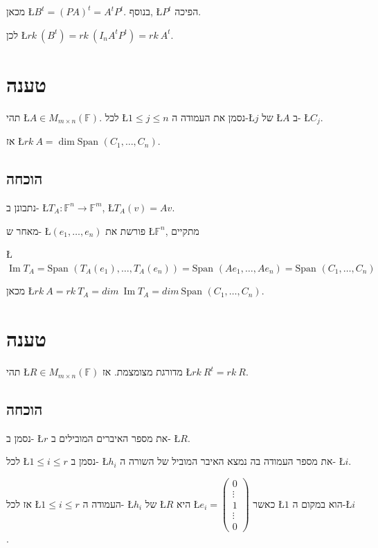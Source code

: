 \documentclass[english,hebrew]{article}
\newcommand{\matrmn}{M_{m\times n}(\mathbb{F})}
\newcommand{\spn}{\text{Span }}
\begin{document}
מכאן \L{$B^{t}=(PA)^{t}=A^{t}P^{t}$}. בנוסף, \L{$P^{t}$} הפיכה.

לכן \L{$rk\:(B^{t})=rk\:(I_{n}A^{t}P^{t})=rk\ A^{t}$}.

\section{טענה}

תהי \L{$A\in\matrmn$}. לכל \L{$1\leq j\le n$} נסמן את העמודה ה-\L{$j$}
של \L{$A$} ב- \L{$C_{j}$}.

אז \L{$rk\:A=\dim\spn(C_{1},\dots,C_{n})$}.

\subsection{הוכחה}

נתבונן ב- \L{$T_{A}:\mathbb{F}^{n}\rightarrow\mathbb{F}^{m}$}, \L{$T_{A}(v)=Av$}.

מאחר ש- \L{$(e_{1},\dots,e_{n})$} פורשת את \L{$\mathbb{F}^{n}$},
מתקיים
\begin{flushright}
\L{$\operatorname{Im}T_{A}=\spn(T_{A}(e_{1}),\dots,T_{A}(e_{n}))=\spn(Ae_{1},\dots,Ae_{n})=\spn(C_{1},\dots,C_{n})$}
\par\end{flushright}

מכאן \L{$rk\:A=rk\:T_{A}=dim\:\operatorname{Im}T_{A}=dim\:\spn(C_{1},\dots,C_{n})$}.

\section{טענה}

תהי \L{$R\in\matrmn$} מדורגת מצומצמת. אז \L{$rk\:R^{t}=rk\:R$}.

\subsection{הוכחה}

נסמן ב- \L{$r$} את מספר האיברים המובילים ב- \L{$R$}.

לכל \L{$1\leq i\leq r$} נסמן ב- \L{$h_{i}$} את מספר העמודה בה נמצא
האיבר המוביל של השורה ה- \L{$i$}.

אז לכל \L{$1\leq i\leq r$} העמודה ה- \L{$h_{i}$} של \L{$R$} היא
\L{$e_{i}=\begin{pmatrix}0\\
\vdots\\
1\\
\vdots\\
0
\end{pmatrix}$} כאשר \L{$1$} הוא במקום ה-\L{$i$}.
\end{document}
